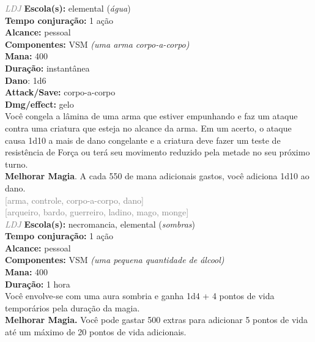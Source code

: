 \documentclass{RPG_Adventure}[2021/10/20]
\begin{document}
{\tiny \textcolor{gray}{\textit{LDJ}}}\jump{}
{\small \t \textbf{Escola(s):} elemental (\textit{água})\\\t \textbf{Tempo conjuração:} 1 ação\\\t \textbf{Alcance:} pessoal\\\t \textbf{Componentes:} VSM \textit{(uma arma corpo-a-corpo)}\\\t \textbf{Mana:} 400\\\t \textbf{Duração:} instantânea\\\t \textbf{Dano}: 1d6\\\t \textbf{Attack/Save:} corpo-a-corpo\\\t \textbf{Dmg/effect:} gelo\\}
{\normalsize Você congela a lâmina de uma arma que estiver empunhando e faz um ataque contra uma criatura que esteja no alcance da arma. Em um acerto, o ataque causa 1d10 a mais de dano congelante e a criatura deve fazer um teste de resistência de Força ou terá seu movimento reduzido pela metade no seu próximo turno.\\\t \textbf{Melhorar Magia}. A cada 550 de mana adicionais gastos, você adiciona 1d10 ao dano.\\}
{\scriptsize \textcolor{gray}{[arma, controle, corpo-a-corpo, dano]\\}}
{\scriptsize \textcolor{gray}{[arqueiro, bardo, guerreiro, ladino, mago, monge]\\}}
{\tiny \textcolor{gray}{\textit{LDJ}}}\jump{}
{\small \t \textbf{Escola(s):} necromancia, elemental (\textit{sombras})\\\t \textbf{Tempo conjuração:} 1 ação\\\t \textbf{Alcance:} pessoal\\\t \textbf{Componentes:} VSM \textit{(uma pequena quantidade de álcool)}\\\t \textbf{Mana:} 400\\\t \textbf{Duração:} 1 hora\\}
{\normalsize Você envolve-se com uma aura sombria e ganha 1d4 + 4 pontos de vida temporários pela duração da magia.\\\t \textbf{Melhorar Magia.} Você pode gastar 500 extras para adicionar 5 pontos de vida até um máximo de 20 pontos de vida adicionais.\\}
\end{document}
